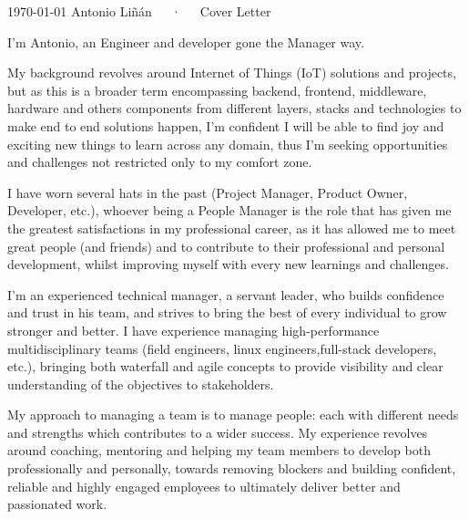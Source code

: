 \documentclass[11pt, a4paper]{awesome-cv}
\begin{document}
\makecvheader[R]

\makecvfooter
  {\today}
  {Antonio Liñán~~~·~~~Cover Letter}
  {}


\begin{cvletter}

I'm Antonio, an Engineer and developer gone the Manager way.

My background revolves around Internet of Things (IoT) solutions and projects, but as this is a broader term encompassing backend, frontend, middleware, hardware and others components from different layers, stacks and technologies to make end to end solutions happen, I'm confident I will be able to find joy and exciting new things to learn across any domain, thus I'm seeking opportunities and challenges not restricted only to my comfort zone.

I have worn several hats in the past (Project Manager, Product Owner, Developer, etc.), whoever being a People Manager is the role that has given me the greatest satisfactions in my professional career, as it has allowed me to meet great people (and friends) and to contribute to their professional and personal development, whilst improving myself with every new learnings and challenges.



I'm an experienced technical manager, a servant leader, who builds confidence and trust in his team, and strives to bring the best of every individual to grow stronger and better.  I have experience managing high-performance multidisciplinary teams (field engineers, linux engineers,full-stack developers, etc.), bringing both waterfall and agile concepts to provide visibility and clear understanding of the objectives to stakeholders.

My approach to managing a team is to manage people: each with different needs and strengths which contributes to a wider success.  My experience revolves around coaching, mentoring and helping my team members to develop both professionally and personally, towards removing blockers and building confident, reliable and highly engaged employees to ultimately deliver better and passionated work.


\end{cvletter}
\end{document}
